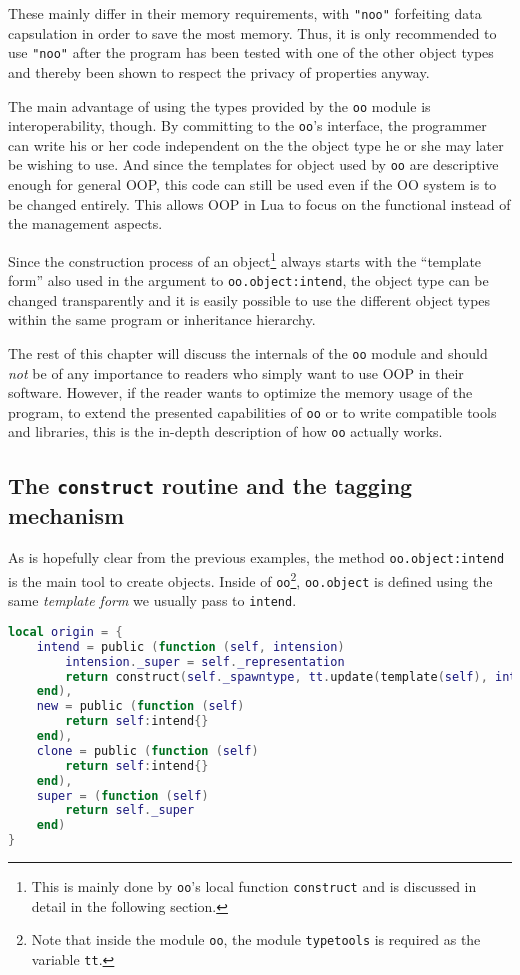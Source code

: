 These mainly differ in their memory requirements, with \texttt{"noo"} forfeiting data capsulation in order to save the most memory. Thus, it is only recommended to use \texttt{"noo"} after the program has been tested with one of the other object types and thereby been shown to respect the privacy of properties anyway.

The main advantage of using the types provided by the \texttt{oo} module is interoperability, though. By committing to the \texttt{oo}'s interface, the programmer can write his or her code independent on the the object type he or she may later be wishing to use. And since the templates for object used by \texttt{oo} are descriptive enough for general OOP, this code can still be used even if the OO system is to be changed entirely. This allows OOP in Lua to focus on the functional instead of the management aspects.

Since the construction process of an object\footnote{This is mainly done by \texttt{oo}'s local function \texttt{construct} and is discussed in detail in the following section.} always starts with the ``template form'' also used in the argument to \texttt{oo.object:intend}, the object type can be changed transparently and it is easily possible to use the different object types within the same program or inheritance hierarchy.

The rest of this chapter will discuss the internals of the \texttt{oo} module and should \emph{not} be of any importance to readers who simply want to use OOP in their software. However, if the reader wants to optimize the memory usage of the program, to extend the presented capabilities of \texttt{oo} or to write compatible tools and libraries, this is the in-depth description of how \texttt{oo} actually works.

\subsection{The \texttt{construct} routine and the tagging mechanism}
\label{sec:oo:tags}

As is hopefully clear from the previous examples, the method \texttt{oo.object:intend} is the main tool to create objects. Inside of \texttt{oo}\footnote{Note that inside the module \texttt{oo}, the module \texttt{typetools} is required as the variable \texttt{tt}.}, \texttt{oo.object} is defined using the same \emph{template form} we usually pass to \texttt{intend}.

\begin{lstlisting}[language=lua, caption={The definition of the methods of \texttt{oo.object} from \texttt{"oo.lua"}}, label=lst:origin, name=lst:origin]
local origin = {
    intend = public (function (self, intension)
        intension._super = self._representation
        return construct(self._spawntype, tt.update(template(self), intension))
    end),
    new = public (function (self)
        return self:intend{}
    end),
    clone = public (function (self)
        return self:intend{}
    end),
    super = (function (self)
        return self._super
    end)
}
\end{lstlisting}

